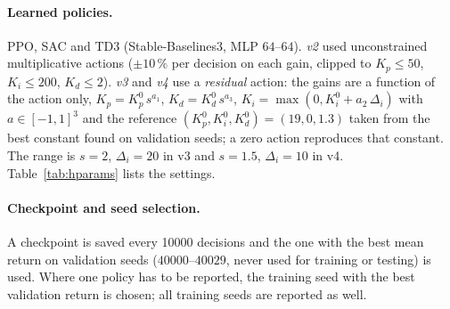 \paragraph*{Learned policies.} PPO, SAC and TD3 (Stable-Baselines3, MLP $64$--$64$). \emph{v2} used unconstrained multiplicative actions ($\pm10\,\%$ per decision on each gain, clipped to $K_p\le50$, $K_i\le200$, $K_d\le2$). \emph{v3} and \emph{v4} use a \emph{residual} action: the gains are a function of the action only, $K_p=K_p^{0}\,s^{a_1}$, $K_d=K_d^{0}\,s^{a_3}$, $K_i=\max(0,K_i^{0}+a_2\,\Delta_i)$ with $a\in[-1,1]^3$ and the reference $(K_p^0,K_i^0,K_d^0)=(19,0,1.3)$ taken from the best constant found on validation seeds; a zero action reproduces that constant. The range is $s=2$, $\Delta_i=20$ in v3 and $s=1.5$, $\Delta_i=10$ in v4. Table~\ref{tab:hparams} lists the settings.

\paragraph*{Checkpoint and seed selection.} A checkpoint is saved every \num{10000} decisions and the one with the best mean return on validation seeds ($40000$--$40029$, never used for training or testing) is used. Where one policy has to be reported, the training seed with the best validation return is chosen; all training seeds are reported as well.
